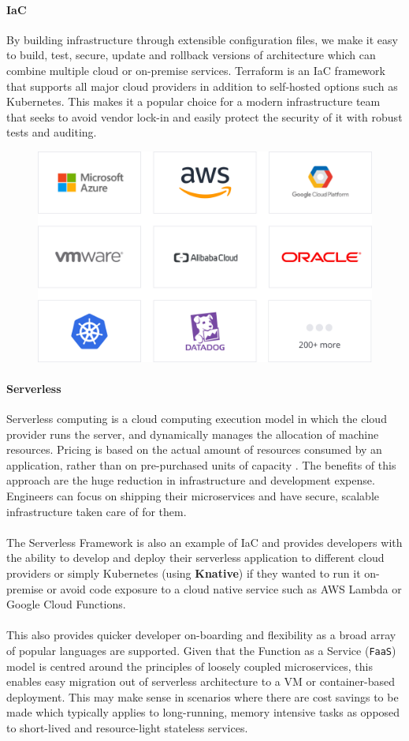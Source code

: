 \documentclass[10pt]{article}
\begin{document}
\paragraph{IaC}
By building infrastructure through extensible configuration files, we make it easy to build, test, secure, update and rollback versions of architecture which can combine multiple cloud or on-premise services. Terraform is an IaC framework that supports all major cloud providers in addition to self-hosted options such as Kubernetes. This makes it a popular choice for a modern infrastructure team that seeks to avoid vendor lock-in and easily protect the security of it with robust tests and auditing.

\begin{figure}[h!]
	\centering
	\includegraphics[width=0.55\linewidth]{images/TerraformProviders.png}	
\end{figure}

\paragraph{Serverless}
Serverless computing is a cloud computing execution model in which the cloud provider runs the server, and dynamically manages the allocation of machine resources. Pricing is based on the actual amount of resources consumed by an application, rather than on pre-purchased units of capacity \cite{serverless}. The benefits of this approach are the huge reduction in infrastructure and development expense. Engineers can focus on shipping their microservices and have secure, scalable infrastructure taken care of for them.
\\ \\
The Serverless Framework is also an example of IaC and provides developers with the ability to develop and deploy their serverless application to different cloud providers or simply Kubernetes (using \textbf{Knative}) if they wanted to run it on-premise or avoid code exposure to a cloud native service such as AWS Lambda or Google Cloud Functions.
\\ \\
This also provides quicker developer on-boarding and flexibility as a broad array of popular languages are supported. Given that the Function as a Service (\texttt{FaaS}) model is centred around the principles of loosely coupled microservices, this enables easy migration out of serverless architecture to a VM or container-based deployment. This may make sense in scenarios where there are cost savings to be made which typically applies to long-running, memory intensive tasks as opposed to short-lived and resource-light stateless services.
\end{document}

